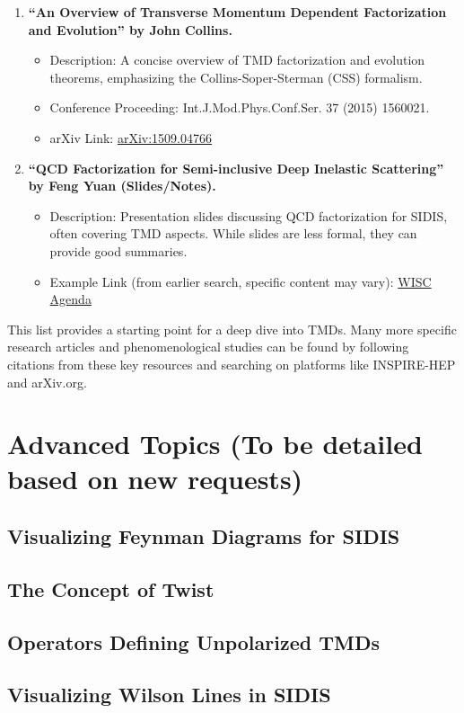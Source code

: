 \documentclass[11pt]{article}
\begin{document}
\begin{enumerate}
  \item \textbf{``An Overview of Transverse Momentum Dependent Factorization and Evolution'' by John Collins.}
        \begin{itemize}
          \item Description: A concise overview of TMD factorization and evolution theorems, emphasizing the Collins-Soper-Sterman (CSS) formalism.
          \item Conference Proceeding: Int.J.Mod.Phys.Conf.Ser. 37 (2015) 1560021.
          \item arXiv Link: \href{https://arxiv.org/abs/1509.04766}{arXiv:1509.04766}
        \end{itemize}

  \item \textbf{``QCD Factorization for Semi-inclusive Deep Inelastic Scattering'' by Feng Yuan (Slides/Notes).}
        \begin{itemize}
          \item Description: Presentation slides discussing QCD factorization for SIDIS, often covering TMD aspects. While slides are less formal, they can provide
                good summaries.
          \item Example Link (from earlier search, specific content may vary):
                \href{https://agenda.hep.wisc.edu/event/1557/contributions/21845/attachments/7516/8503/sp-yuan.pdf}{WISC Agenda}
        \end{itemize}
\end{enumerate}

This list provides a starting point for a deep dive into TMDs. Many more specific research articles and phenomenological studies can be found by
following citations from these key resources and searching on platforms like INSPIRE-HEP and arXiv.org.

\section{Advanced Topics (To be detailed based on new requests)}

\subsection{Visualizing Feynman Diagrams for SIDIS}

\subsection{The Concept of Twist}

\subsection{Operators Defining Unpolarized TMDs}

\subsection{Visualizing Wilson Lines in SIDIS}
\end{document}
